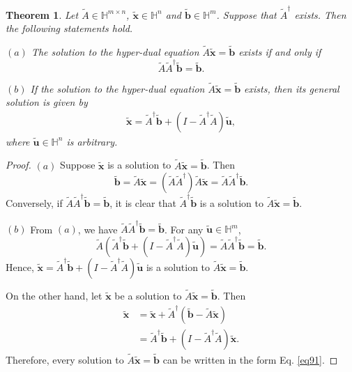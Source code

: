 \documentclass[10pt,a4paper]{amsart}
\newtheorem{thm}{Theorem}
\begin{document}
\begin{thm}\label{3.3}
Let $\widetilde{A}\in\mathbb{H}^{m\times n}$, $ \widetilde{\mathbf{x}}\in\mathbb{H}^{n}$ and $\widetilde{\mathbf{b}}\in\mathbb{H}^{m}$. Suppose that $\widetilde{A}^{\dag}$ exists. Then the following statements hold.

$(a)$ The solution  to the hyper-dual  equation
$\widetilde{A}\widetilde{\mathbf{x}}=\widetilde{\mathbf{b}}$ exists  if and only if $$\widetilde{A}\widetilde{A}^{\dag}
\widetilde{\mathbf{b}}=\widetilde{\mathbf{b}}.$$

$(b)$  If the solution to the hyper-dual equation $\widetilde{A}\widetilde{\mathbf{x}}=\widetilde{\mathbf{b}}$ exists, then its general solution is given by \begin{align}\label{eq91} \widetilde{\mathbf{x}}=\widetilde{A}^{\dag}\widetilde{\mathbf{b}}
+(I-\widetilde{A}^{\dag}\widetilde{A})\widetilde{\mathbf{u}},
\end{align} where $\widetilde{\mathbf{u}}\in \mathbb{H}^{n}$ is arbitrary.
\end{thm}

\begin{proof}
$(a)$ Suppose $\widetilde{\mathbf{x}}$ is a solution to $\widetilde{A}
\widetilde{\mathbf{x}}=\widetilde{\mathbf{b}}$. Then
$$\widetilde{\mathbf{b}}=\widetilde{A}
\widetilde{\mathbf{x}}=(\widetilde{A}\widetilde{A}^{\dag})
\widetilde{A}
\widetilde{\mathbf{x}}=
\widetilde{A}\widetilde{A}^{\dag}
\widetilde{\mathbf{b}}.$$ Conversely, if
$\widetilde{A}\widetilde{A}^{\dag}
\widetilde{\mathbf{b}}
=\widetilde{\mathbf{b}}$, it is clear that $\widetilde{A}^{\dag}\widetilde{\mathbf{b}}$ is a solution to $\widetilde{A}
\widetilde{\mathbf{x}}
=\widetilde{\mathbf{b}}$.

 $(b)$  From $(a)$, we have $\widetilde{A}\widetilde{A}^{\dag}
 \widetilde{\mathbf{b}}=\widetilde{\mathbf{b}}$. For any $\widetilde{\mathbf{u}}\in \mathbb{H}^{m}$,   $$
\widetilde{A}(\widetilde{A}^{\dag}
\widetilde{\mathbf{b}}+
(I-\widetilde{A}^{\dag}\widetilde{A})
\widetilde{\mathbf{u}})
=\widetilde{A}\widetilde{A}^{\dag}\widetilde{\mathbf{b}}
=\widetilde{\mathbf{b}}.$$ Hence, $\widetilde{\mathbf{x}}=\widetilde{A}^{\dag}\widetilde{\mathbf{b}}
+(I-\widetilde{A}^{\dag}\widetilde{A})
\widetilde{\mathbf{u}}$ is a solution to $\widetilde{A}
\widetilde{\mathbf{x}}=\widetilde{\mathbf{b}}$.

On the other hand, let
$\widetilde{\mathbf{x}}$ be a solution to $\widetilde{A}
\widetilde{\mathbf{x}}=\widetilde{\mathbf{b}}$.
 Then
\begin{align}\nonumber \widetilde{\mathbf{x}}&=\widetilde{\mathbf{x}}
+\widetilde{A}^{\dag}(\widetilde{\mathbf{b}}-
\widetilde{A}\widetilde{\mathbf{x}})\\ \nonumber
&=\widetilde{A}^{\dag}\widetilde{\mathbf{b}}+
(I-\widetilde{A}^{\dag}\widetilde{A})\widetilde{\mathbf{x}}.
\end{align}
Therefore, every solution to $\widetilde{A}\widetilde{\mathbf{x}}
=\widetilde{\mathbf{b}}$ can be written in the form Eq. \eqref{eq91}.
\end{proof}
\end{document}
